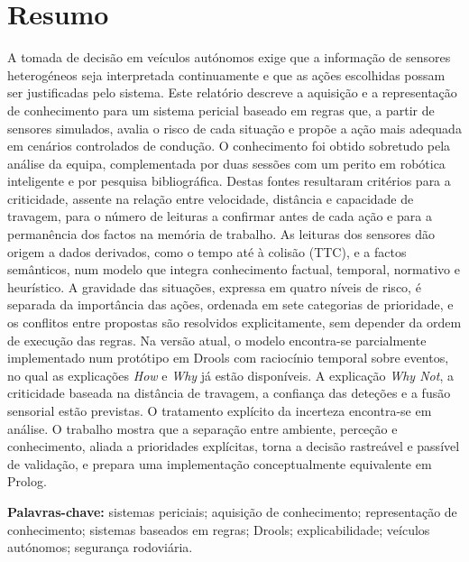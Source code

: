 \chapter*{Resumo}

A tomada de decisão em veículos autónomos exige que a informação de
sensores heterogéneos seja interpretada continuamente e que as ações
escolhidas possam ser justificadas pelo sistema. Este relatório descreve a
aquisição e a representação de conhecimento para um sistema pericial baseado
em regras que, a partir de sensores simulados, avalia o risco de cada situação
e propõe a ação mais adequada em cenários controlados de condução. O
conhecimento foi obtido sobretudo pela análise da equipa, complementada por
duas sessões com um perito em robótica inteligente e por pesquisa
bibliográfica. Destas fontes resultaram critérios para a criticidade, assente
na relação entre velocidade, distância e capacidade de travagem, para o número
de leituras a confirmar antes de cada ação e para a permanência dos factos na
memória de trabalho. As leituras dos sensores dão origem a dados derivados, como
o tempo até à colisão (TTC), e a factos semânticos, num modelo que integra
conhecimento factual, temporal, normativo e heurístico. A gravidade das situações,
expressa em quatro níveis de risco, é separada da importância das ações,
ordenada em sete categorias de prioridade, e os conflitos entre propostas
são resolvidos explicitamente, sem depender da ordem de execução das
regras. Na versão atual, o modelo encontra-se parcialmente implementado num
protótipo em Drools com raciocínio temporal sobre eventos, no qual as explicações
\emph{How} e \emph{Why} já estão disponíveis. A explicação \emph{Why Not}, a
criticidade baseada na distância de travagem, a confiança das deteções e a fusão
sensorial estão previstas. O tratamento explícito da incerteza encontra-se em
análise. O trabalho mostra que a separação entre ambiente, perceção e conhecimento,
aliada a prioridades explícitas, torna a decisão rastreável e passível de
validação, e prepara uma implementação conceptualmente equivalente em Prolog.

\vspace{0.8cm}
\noindent\textbf{Palavras-chave:} sistemas periciais; aquisição de
conhecimento; representação de conhecimento; sistemas baseados em regras;
Drools; explicabilidade; veículos autónomos; segurança rodoviária.

\clearpage
